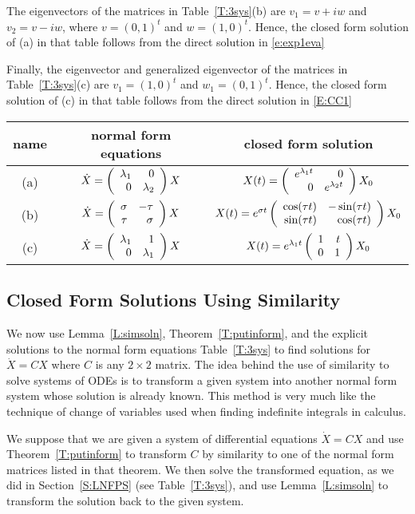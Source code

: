 \documentclass{ximera}
\begin{document}
The eigenvectors of the matrices in Table~\ref{T:3sys}(b) are $v_1 = v+iw$ 
and $v_2 = v-iw$, where $v=(0,1)^t$ and $w=(1,0)^t$. Hence, the closed form 
solution of (a) in that table follows from the direct solution in \eqref{e:exp1eva} 

Finally, the eigenvector and generalized eigenvector of the matrices in 
Table~\ref{T:3sys}(c) are $v_1 = (1,0)^t$ and $w_1 = (0,1)^t$. Hence, 
the closed form solution of (c) in that table follows from the direct 
solution in \eqref{E:CC1} 

\begin{table*}[t!]
\begin{center}
\begin{tabular}{|c|c|c|}
\hline
name  & normal form equations & closed form solution \\
\hline
(a) & $\dot{X} = \left(\begin{array}{rr} \lambda_1 & 0\\ 0 &\lambda_2\end{array}\right) X$ &
$X(t) = \left(\begin{array}{rr} e^{\lambda_1 t} & 0\\ 0 &e^{\lambda_2 t}\end{array}\right)X_0$ \\
\hline
(b) & $\dot{X}=\left(\begin{array}{rr} \sigma & -\tau\\ \tau &\sigma\end{array}\right)X$ & $X(t) = e^{\sigma t}
\left(\begin{array}{rr} \cos(\tau t) & -\sin(\tau t)\\ \sin(\tau t) &\cos(\tau t)\end{array}\right)X_0$\\
\hline
(c) & $\dot{X} = \left(\begin{array}{rr} \lambda_1 & 1\\ 0 &\lambda_1\end{array}\right)X$ &
$X(t) = e^{\lambda_1 t}\left(\begin{array}{rr} 1 & t\\ 0 &1\end{array}\right)X_0$ \\
\hline
\end{tabular}
\caption{Solutions to Jordan normal form ODEs with $X(0)=X_0$.}
\label{T:3sys}
\end{center}
\end{table*}



\subsection*{Closed Form Solutions Using Similarity}

We now use Lemma~\ref{L:simsoln}, Theorem~\ref{T:putinform}, and the
explicit solutions to the normal form equations Table~\ref{T:3sys}
to find solutions for $\dot{X}=CX$ where $C$ is any $2\times 2$ matrix.
The idea behind the use of similarity to solve systems of ODEs is to
transform a given system into another normal form system whose solution is
already known.  This method is very much like the technique of change of
variables used when finding indefinite integrals in calculus.

We suppose that we are given a system of differential equations $\dot{X}=CX$
and use Theorem~\ref{T:putinform} to transform $C$ by similarity to one of
the normal form matrices listed in that theorem.  We then solve the
transformed equation, as we did in Section~\ref{S:LNFPS} (see
Table~\ref{T:3sys}), and use Lemma~\ref{L:simsoln} to transform the solution
back to the given system.
\end{document}
